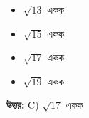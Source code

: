 \documentclass[12pt, a4paper]{article}
\begin{document}
\vspace{1em}
\begin{itemize}[label={}, leftmargin=1cm, itemsep=0.5em]
    \item[\textbf{A)}] $\sqrt{13}$ একক
    \item[\textbf{B)}] $\sqrt{15}$ একক
    \item[\textbf{C)}] $\sqrt{17}$ একক
    \item[\textbf{D)}] $\sqrt{19}$ একক
\end{itemize}

\vspace{0.5em}
\begin{tcolorbox}[answerbox]
    \textbf{\color{success} উত্তর:} C) $\sqrt{17}$ একক
\end{tcolorbox}
\vspace{1em}
\end{document}
